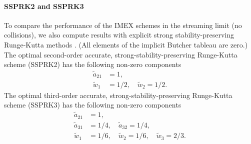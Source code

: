\paragraph{SSPRK2 and SSPRK3}

To compare the performance of the IMEX schemes in the streaming limit (no collisions), we also compute results with explicit strong stability-preserving Runge-Kutta methods \cite{gottlieb_etal_2001}.  
(All elements of the implicit Butcher tableau are zero.)  
The optimal second-order accurate, strong-stability-preserving Runge-Kutta scheme (SSPRK2) has the following non-zero components
\begin{align}
  \tilde{a}_{21} &= 1, \nonumber \\
  \tilde{w}_{1} &= 1/2, \quad \tilde{w}_{2} = 1/2. \nonumber 
\end{align}
The optimal third-order accurate, strong-stability-preserving Runge-Kutta scheme (SSPRK3) has the following non-zero components
\begin{align}
  \tilde{a}_{21} &= 1, \nonumber \\
  \tilde{a}_{31} &= 1/4, \quad \tilde{a}_{32} = 1/4, \nonumber \\
  \tilde{w}_{1} &= 1/6, \quad \tilde{w}_{2} = 1/6, \quad \tilde{w}_{3} =2/3. \nonumber
\end{align}